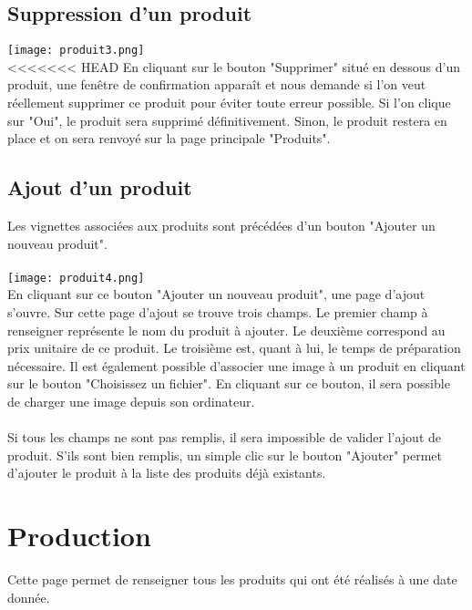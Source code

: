 \subsection{Suppression d'un produit}
\texttt{[image: produit3.png]}\\
<<<<<<< HEAD
En cliquant sur le bouton "Supprimer" situé en dessous d'un produit, une
fenêtre de confirmation apparaît et nous demande si l'on veut réellement supprimer
ce produit pour éviter toute erreur possible. Si l'on clique sur "Oui", le
produit sera supprimé définitivement. Sinon, le produit restera en place et on
sera renvoyé sur la page principale "Produits".


\subsection{Ajout d'un produit}
Les vignettes associées aux produits sont précédées d'un bouton "Ajouter un
nouveau produit".

\paragraph{}
\texttt{[image: produit4.png]}\\
En cliquant sur ce bouton "Ajouter un nouveau produit", une page d'ajout s'ouvre.
Sur cette page d'ajout se trouve trois champs. Le premier champ à renseigner
représente le nom du produit à ajouter. Le deuxième correspond au prix unitaire
de ce produit. Le troisième est, quant à lui, le temps de préparation nécessaire.
Il est également possible d'associer une image à un produit en cliquant sur le
bouton "Choisissez un fichier". En cliquant sur ce bouton, il sera possible de
charger une image depuis son ordinateur.

\paragraph{}
Si tous les champs ne sont pas remplis, il sera impossible de valider l'ajout de
produit. S'ils sont bien remplis, un simple clic sur le bouton "Ajouter"
permet d'ajouter le produit à la liste des produits déjà existants.



\section{Production}
Cette page permet de renseigner tous les produits qui ont été réalisés à une date
donnée.

